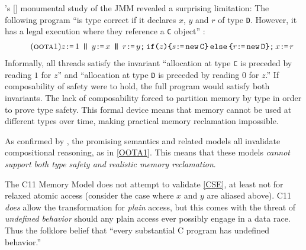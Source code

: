 \citeauthor{DBLP:journals/toplas/Lochbihler13}'s
[\citeyear{DBLP:journals/toplas/Lochbihler13}] monumental study of the JMM
revealed a surprising limitation: The following program ``is type correct if
it declares $x$, $y$ and $r$ of type \texttt{D}. However, it has a legal
execution where they reference a \texttt{C} object''
\citep[Fig.~8]{DBLP:journals/toplas/Lochbihler13}:
\begin{gather}
  \taglabel{OOTA1}
  z \GETS 1
  \PAR %
  y\GETS x
  \PAR
  \aReg\GETS y \SEMI \IF{z} \THEN \bReg \GETS \NEW \texttt{C} \ELSE \aReg \GETS \NEW \texttt{D} \FI  \SEMI x \GETS \aReg 
\end{gather}
Informally, all threads satisfy the invariant ``allocation at type \texttt{C}
is preceded by reading $1$ for $z$'' and ``allocation at type \texttt{D} is
preceded by reading $0$ for $z$.''  If composability of safety were to hold,
the full program would satisfy both invariants.  The lack of composability
forced \citeauthor{DBLP:journals/toplas/Lochbihler13} to partition memory by
type in order to prove type safety.  This formal device means that memory
cannot be used at different types over time, making practical memory
reclamation impossible.


As confirmed by \cite{kang,soham}, the promising semantics
\cite{DBLP:conf/popl/KangHLVD17} and related models
\citep{DBLP:conf/esop/JagadeesanPR10,DBLP:journals/pacmpl/ChakrabortyV19} all
invalidate compositional reasoning, as in \ref{OOTA1}.  %
This means that these models \emph{cannot support both type safety and
  realistic memory reclamation}.


The C11 Memory Model \cite{Batty:2011:MCC:1926385.1926394} does not attempt
to validate \ref{CSE}, at least not for relaxed atomic access (consider the
case where $x$ and $y$ are aliased above).  C11 \emph{does} allow the
transformation for \emph{plain} access, but this comes with the threat of
\emph{undefined behavior} should any plain access ever possibly engage in a
data race.  Thus the folklore belief that ``every substantial C program has
undefined behavior.''


